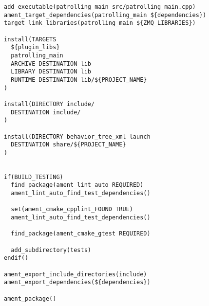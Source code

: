 \begin{tcolorbox}[sharp corners, colframe=gray!80, colback=LightGray, left=0pt, top=0pt, bottom=0pt, title=\texttt{br2\_bt\_patrolling/CMakeLists.txt}]
\begin{verbatim}
add_executable(patrolling_main src/patrolling_main.cpp)
ament_target_dependencies(patrolling_main ${dependencies})
target_link_libraries(patrolling_main ${ZMQ_LIBRARIES})

install(TARGETS
  ${plugin_libs}
  patrolling_main
  ARCHIVE DESTINATION lib
  LIBRARY DESTINATION lib
  RUNTIME DESTINATION lib/${PROJECT_NAME}
)

install(DIRECTORY include/
  DESTINATION include/
)

install(DIRECTORY behavior_tree_xml launch
  DESTINATION share/${PROJECT_NAME}
)


if(BUILD_TESTING)
  find_package(ament_lint_auto REQUIRED)
  ament_lint_auto_find_test_dependencies()

  set(ament_cmake_cpplint_FOUND TRUE)
  ament_lint_auto_find_test_dependencies()

  find_package(ament_cmake_gtest REQUIRED)

  add_subdirectory(tests)
endif()

ament_export_include_directories(include)
ament_export_dependencies(${dependencies})

ament_package()
    \end{verbatim}
    \end{tcolorbox}
  \normalsize

